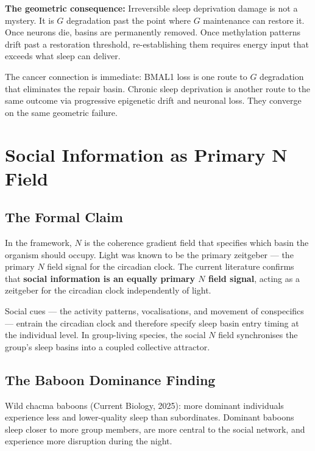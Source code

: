 \documentclass[10pt, a4paper]{article}
\begin{document}
\textbf{The geometric consequence:}
Irreversible sleep deprivation damage
is not a mystery. It is $G$ degradation
past the point where $G$ maintenance
can restore it. Once neurons die,
basins are permanently removed.
Once methylation patterns drift past
a restoration threshold, re-establishing
them requires energy input that
exceeds what sleep can deliver.

The cancer connection is immediate:
BMAL1 loss is one route to $G$
degradation that eliminates the
repair basin. Chronic sleep deprivation
is another route to the same outcome
via progressive epigenetic drift and
neuronal loss. They converge on
the same geometric failure.

\section{Social Information as Primary
N Field}
\label{sec:social}

\subsection{The Formal Claim}

In the framework, $N$ is the coherence
gradient field that specifies which
basin the organism should occupy.
Light was known to be the primary
zeitgeber --- the primary $N$ field
signal for the circadian clock. The
current literature confirms that
\textbf{social information is an
equally primary $N$ field signal},
acting as a zeitgeber for the circadian
clock independently of light.

Social cues --- the activity patterns,
vocalisations, and movement of
conspecifics --- entrain the circadian
clock and therefore specify sleep
basin entry timing at the individual
level. In group-living species, the
social $N$ field synchronises the
group's sleep basins into a coupled
collective attractor.

\subsection{The Baboon Dominance Finding}

Wild chacma baboons (Current Biology,
2025): more dominant individuals
experience less and lower-quality sleep
than subordinates. Dominant baboons
sleep closer to more group members,
are more central to the social network,
and experience more disruption during
the night.
\end{document}
